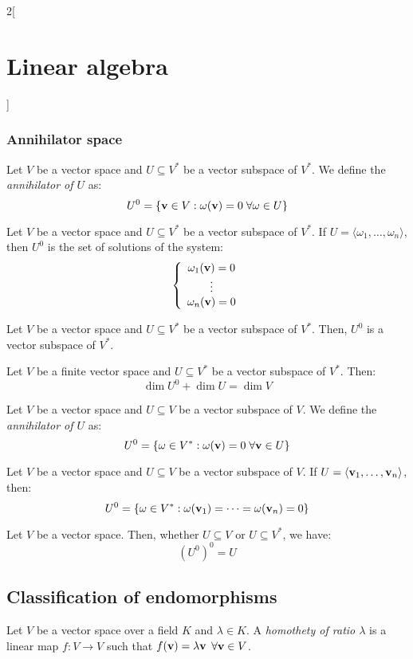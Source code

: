 \documentclass[../../../main.tex]{subfiles}
\begin{document}
\begin{multicols}{2}[\section{Linear algebra}]
  \subsubsection*{Annihilator space}
  \begin{definition}
    Let $V$ be a vector space and $U\subseteq V^*$ be a vector subspace of $V^*$. We define the \textit{annihilator of $U$} as:
    $$U^0=\{\vb{v}\in V:\omega(\vb{v})=0\;\forall\omega\in U\}$$
  \end{definition}
  \begin{lemma}
    Let $V$ be a vector space and $U\subseteq V^*$ be a vector subspace of $V^*$. If $U=\langle\omega_1,\ldots,\omega_n\rangle$, then $U^0$ is the set of solutions of the system:
    $$\left\{
      \begin{array}{c}
        \omega_1(\vb{v})=0 \\
        \vdots                    \\
        \omega_n(\vb{v})=0
      \end{array}
      \right.$$
  \end{lemma}
  \begin{lemma}
    Let $V$ be a vector space and $U\subseteq V^*$ be a vector subspace of $V^*$. Then, $U^0$ is a vector subspace of $V^*$.
  \end{lemma}
  \begin{theorem}
    Let $V$ be a finite vector space and $U\subseteq V^*$ be a vector subspace of $V^*$. Then: $$\dim U^0+\dim U=\dim V$$
  \end{theorem}
  \begin{definition}
    Let $V$ be a vector space and $U\subseteq V$ be a vector subspace of $V$. We define the \textit{annihilator of $U$} as:
    $$U^0=\{\omega\in V^*:\omega(\vb{v})=0\;\forall\vb{v}\in U\}$$
  \end{definition}
  \begin{lemma}
    Let $V$ be a vector space and $U\subseteq V$  be a vector subspace of $V$. If $U=\langle\vb{v}_1,\ldots,\vb{v}_n\rangle$, then: $$U^0=\{\omega\in V^*:\omega(\vb{v}_1)=\cdots=\omega(\vb{v}_n)=0\}$$
  \end{lemma}
  \begin{prop}
    Let $V$ be a vector space. Then, whether $U\subseteq V$ or $U\subseteq V^*$, we have: $${(U^0)}^0=U$$
  \end{prop}
  \subsection{Classification of endomorphisms}
  \begin{definition}
    Let $V$ be a vector space over a field $K$ and $\lambda\in K$. A \textit{homothety of ratio $\lambda$} is a linear map $f:V\rightarrow V$ such that $f(\vb{v})=\lambda\vb{v}$ $\forall\vb{v}\in V$.
  \end{definition}

\end{multicols}
\end{document}
